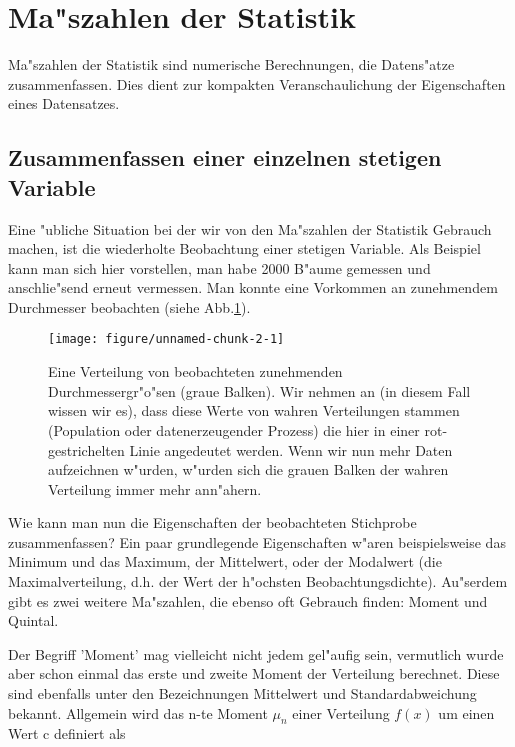 \documentclass[a4paper,twoside]{tufte-book}\usepackage[]{graphicx}\usepackage[]{color}
\makeatletter
\def\maxwidth{ %
  \ifdim\Gin@nat@width>\linewidth
    \linewidth
  \else
    \Gin@nat@width
  \fi
}
\makeatother
\begin{document}
	\section{Ma"szahlen der Statistik}
	
	Ma"szahlen der Statistik sind numerische Berechnungen, die Datens"atze zusammenfassen. Dies dient zur kompakten Veranschaulichung der Eigenschaften eines Datensatzes.
	
	\subsection{Zusammenfassen einer einzelnen stetigen Variable}
	
	Eine "ubliche Situation bei der wir von den Ma"szahlen der Statistik Gebrauch machen, ist die wiederholte Beobachtung einer stetigen Variable. Als Beispiel kann man sich hier vorstellen, man habe 2000 B"aume gemessen und anschlie"send erneut vermessen. Man konnte eine Vorkommen an zunehmendem Durchmesser beobachten (siehe Abb.\ref{fig: data distribution}).

\begin{figure}[htbp]
\begin{center}
\begin{Schunk}

\texttt{[image: figure/unnamed-chunk-2-1]} \end{Schunk}
\caption{Eine Verteilung von beobachteten zunehmenden Durchmessergr"o"sen (graue Balken). Wir nehmen an (in diesem Fall wissen wir es), dass diese Werte von wahren Verteilungen stammen (Population oder datenerzeugender Prozess) die hier in einer rot-gestrichelten Linie angedeutet werden. Wenn wir nun mehr Daten aufzeichnen w"urden, w"urden sich die grauen Balken der wahren Verteilung immer mehr ann"ahern.}
\label{fig: data distribution}
\end{center}
\end{figure}

Wie kann man nun die Eigenschaften der beobachteten Stichprobe zusammenfassen? Ein paar grundlegende Eigenschaften w"aren beispielsweise das Minimum und das Maximum, der Mittelwert, oder der Modalwert (die Maximalverteilung, d.h. der Wert der h"ochsten Beobachtungsdichte). Au"serdem  gibt es zwei weitere Ma"szahlen, die ebenso oft Gebrauch finden: Moment und Quintal.


Der Begriff 'Moment' mag vielleicht nicht jedem gel"aufig sein, vermutlich wurde aber schon einmal das erste und zweite Moment der Verteilung berechnet. Diese sind ebenfalls unter den Bezeichnungen Mittelwert und Standardabweichung bekannt. Allgemein wird das n-te Moment $\mu_n$ einer Verteilung $f(x)$ um einen Wert c definiert als 
\end{document}
